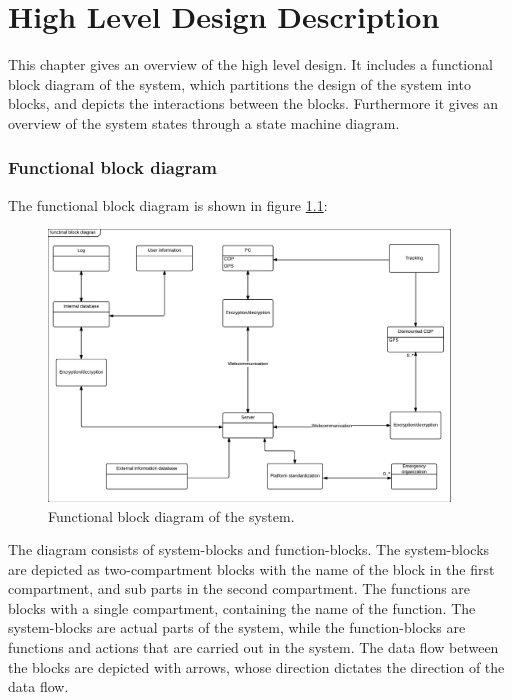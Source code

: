 \chapter{High Level Design Description}
\label{high_level}
This chapter gives an overview of the high level design. It includes a functional block diagram of the system, which partitions the design of the system into blocks, and depicts the interactions between the blocks. Furthermore it gives an overview of the system states through a state machine diagram. 

\subsection{Functional block diagram}
The functional block diagram is shown in figure \ref{fig:func_block_diagram}:

\begin{figure}[H]
\centering
\includegraphics[width=0.95\textwidth]
{billeder/functional_block_diagram.pdf}
\caption{Functional block diagram of the system.}
\label{fig:func_block_diagram}
\end{figure}

The diagram consists of system-blocks and function-blocks. The system-blocks are depicted as two-compartment blocks with the name of the block in the first compartment, and sub parts in the second compartment. The functions are blocks with a single compartment, containing the name of the function. The system-blocks are actual parts of the system, while the function-blocks are functions and actions that are carried out in the system. The data flow between the blocks are depicted with arrows, whose direction dictates the direction of the data flow. 

